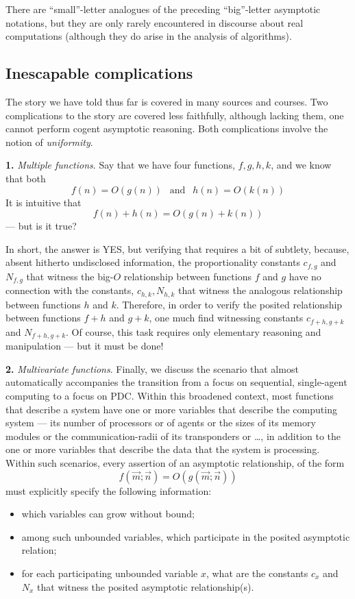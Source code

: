\medskip

%
There are ``small''-letter analogues of the preceding ``big''-letter
asymptotic notations, but they are only rarely encountered in
discourse about real computations (although they do arise in the
analysis of algorithms).

\subsection{Inescapable complications}

The story we have told thus far is covered in many sources and
courses.  Two complications to the story are covered less faithfully,
although lacking them, one cannot perform cogent asymptotic
reasoning.  Both complications involve the notion of {\em uniformity}.

\noindent
{\bf 1.}
{\em Multiple functions}.
%
Say that we have four functions, $f, g, h, k$, and we know that both
\[ f(n) = O(g(n)) \ \ \mbox{ and } \ \ h(n) = O(k(n)) \]
It is intuitive that
\[ f(n) + h(n) = O(g(n) + k(n)) \]
--- but is it true?

In short, the answer is YES, but verifying that requires a bit of
subtlety, because, absent hitherto undisclosed information, the
proportionality constants $c_{f,g}$ and $N_{f,g}$ that witness the
big-$O$ relationship between functions $f$ and $g$ have no connection
with the constants, $c_{h,k}, N_{h,k}$ that witness the analogous
relationship between functions $h$ and $k$.  Therefore, in order to
verify the posited relationship between functions $f + h$ and $g + k$,
one much find witnessing constants $c_{f+h, g+k}$ and $N_{f+h,g+k}$.
Of course, this task requires only elementary reasoning and
manipulation --- but it must be done!

{\bf 2.}
{\em Multivariate functions}.
%
Finally, we discuss the scenario that almost automatically accompanies
the transition from a focus on sequential, single-agent computing to a
focus on PDC.  Within this broadened context, most functions that
describe a system have one or more variables that describe the
computing system --- its number of processors or of agents or the
sizes of its memory modules or the communication-radii of its
transponders or \ldots, in addition to the one or more variables that
describe the data that the system is processing.  Within such
scenarios, every assertion of an asymptotic relationship, of the form
\[ f(\vec{m}; \vec{n}) = O(g(\vec{m}; \vec{n})) \]
must explicitly specify the following information:
\begin{itemize}
\item
which variables can grow without bound;
\item
among such unbounded variables, which participate in the posited
asymptotic relation;
\item
for each participating unbounded variable $x$, what are the constants
$c_x$ and $N_x$ that witness the posited asymptotic relationship(s).
\end{itemize}

